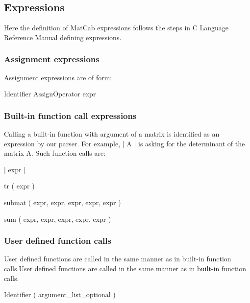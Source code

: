 \documentclass[12pt]{article} %
\begin{document}
\subsection{Expressions}
Here the definition of MatCab expressions follows the steps in C Language Reference Manual defining expressions.

\subsubsection{Assignment expressions}
Assignment expressions are of form:
\begin {center}
Identifier AssignOperator expr
\end {center}

\subsubsection{ Built-in function call expressions}
Calling a built-in function with argument of a matrix is identified as an expression by our parser. For example, | A | is asking for the determinant of the matrix A. Such function calls are:
\begin {center}
| expr |

tr ( expr )

submat ( expr, expr, expr, expr, expr )

sum ( expr, expr, expr, expr, expr )

\end {center}

\subsubsection{User defined function calls}
User defined functions are called in the same manner as in built-in function calls.User defined functions are called in the same manner as in built-in function calls.
\begin {center}
Identifier ( argument\_list\_optional )
\end {center}

\end{document}
